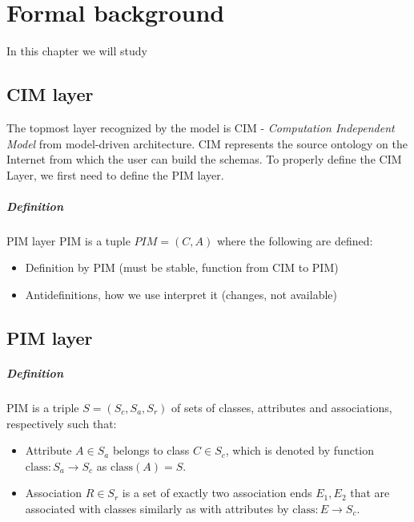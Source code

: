 \chapter{Formal background}
\label{chapters:formal-background}

In this chapter we will study

\section{CIM layer}

The topmost layer recognized by the model is CIM - \textit{Computation Independent Model} from model-driven architecture. CIM represents the source ontology on the Internet from which the user can build the schemas. To properly define the CIM Layer, we first need to define the PIM layer.

\paragraph{Definition} PIM layer $\textrm{PIM}$ is a tuple $PIM = (C, A)$ where the following are defined:


\begin{itemize}
    \item Definition by PIM (must be stable, function from CIM to PIM)
    \item Antidefinitions, how we use interpret it (changes, not available)
\end{itemize}

\section{PIM layer}

\paragraph{Definition} PIM is a triple $S=(S_c, S_a, S_r)$ of sets of classes, attributes and associations, respectively such that:
\begin{itemize}
    \item Attribute $A \in S_a$ belongs to class $C \in S_c$, which is denoted by function $\textrm{class}: S_a \rightarrow S_c$ as $\textrm{class}(A)=S$.
    \item Association $R \in S_r$ is a set of exactly two association ends ${E_1, E_2}$ that are associated with classes similarly as with attributes by $\textrm{class}: E \rightarrow S_c$.
\end{itemize}


